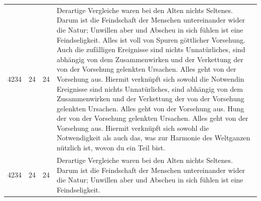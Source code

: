 {\begin{tabular}{lrcp{18cm}}
4234 & 24  & 24   & Derartige Vergleiche waren bei den Alten nichts Seltenes. Darum ist die Feindschaft der Menschen untereinander wider die Natur; Unwillen aber und Abscheu in sich fühlen ist eine Feindseligkeit. Alles ist voll von Spuren göttlicher Vorsehung. Auch die zufälligen Ereignisse sind nichts Unnatürliches, sind abhängig von dem Zusammenwirken und der Verkettung der von der Vorsehung gelenkten Ursachen. Alles geht von der Vorsehung aus. Hiermit verknüpft sich sowohl die Notwendin Ereignisse sind nichts Unnatürliches, sind abhängig von dem Zusammenwirken und der Verkettung der von der Vorsehung gelenkten Ursachen. Alles geht von der Vorsehung aus. Hung der von der Vorsehung gelenkten Ursachen. Alles geht von der Vorsehung aus. Hiermit verknüpft sich sowohl die Notwendigkeit als auch das, was zur Harmonie des Weltganzen nützlich ist, wovon du ein Teil bist. \\
4234 & 24  & 24   & Derartige Vergleiche waren bei den Alten nichts Seltenes. Darum ist die Feindschaft der Menschen untereinander wider die Natur; Unwillen aber und Abscheu in sich fühlen ist eine Feindseligkeit. \\
\end{tabular}}


